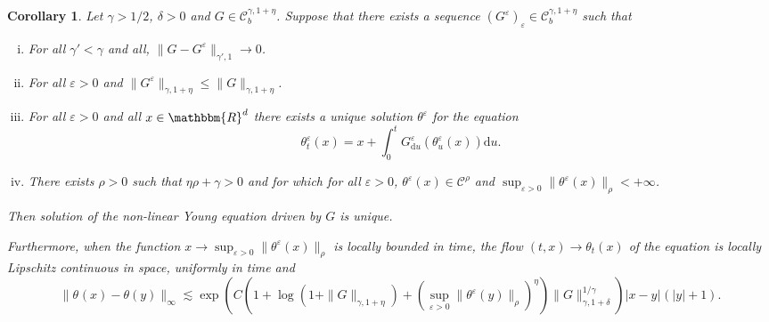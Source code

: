 \documentclass[a4paper,11pt]{article}
\newcommand{\mathd}{\mathrm{d}}
\newcommand{\nocomma}{}
\newenvironment{enumerateroman}{\begin{enumerate}[i.] }{\end{enumerate}}
\newtheorem{corollary}[theorem]{Corollary}
\newcommand{\CC}{\mathscr C}
\begin{document}
\begin{corollary}
  \label{corollary:uniqueness_a_priori_case}Let $\gamma >1/2 \nocomma$,
  $\delta >0$ and $G \in \CC^{\gamma ,1+ \eta}_{b}$. Suppose that there exists
  a sequence $( G^{\varepsilon} )_{\varepsilon} \in \CC^{\gamma ,1+ \eta}_{b}$
  such that
  \begin{enumerateroman}
    \item For all $\gamma' < \gamma$ and all, $\| G-G^{\varepsilon}
    \|_{\gamma' ,1} \rightarrow 0$.
    
    \item For all $\varepsilon >0$ and $\| G^{\varepsilon} \|_{\gamma ,1+
    \eta} \leqslant \| G \|_{\gamma ,1+ \eta}$.
    
    \item For all $\varepsilon >0$ and all $x \in \mathbbm{R}^{d}$ there
    exists a unique solution $\theta^{\varepsilon}$ for the equation
    \[ \theta^{\varepsilon}_{t} ( x ) =x+ \int_{0}^{t}
       G^{\varepsilon}_{\mathd u} ( \theta^{\varepsilon}_{u} ( x ) ) \mathd u.
    \]
    \item There exists $\rho >0$ such that $\eta \rho + \gamma >0$ and for
    which for all $\varepsilon >0$, $\theta^{\varepsilon} ( x ) \in
    \CC^{\rho}$ and $\sup_{\varepsilon >0} \| \theta^{\varepsilon} ( x )
    \|_{\rho} <+ \infty$.
  \end{enumerateroman}
  Then solution of the non-linear Young equation driven by $G$ is unique.
  
  Furthermore, when the function $x \rightarrow \sup_{\varepsilon >0} \|
  \theta^{\varepsilon} ( x ) \|_{\rho}$ is locally bounded in time, the flow
  $( t,x ) \rightarrow \theta_{t} ( x )$ of the equation is locally Lipschitz
  continuous in space, uniformly in time and
  \[ \| \theta^{} ( x ) - \theta ( y ) \|_{\infty} \lesssim \exp ( C ( 1+
     \log ( 1+ \| G \|_{\gamma ,1+ \eta} ) + ( \sup_{\varepsilon >0} \|
     \theta^{\varepsilon} ( y ) \|_{\rho} )^{\eta} ) \| G \|_{\gamma ,1+
     \delta}^{1/ \gamma} ) | x-y |^{} ( | y | +1 ) . \]
\end{corollary}
\end{document}
